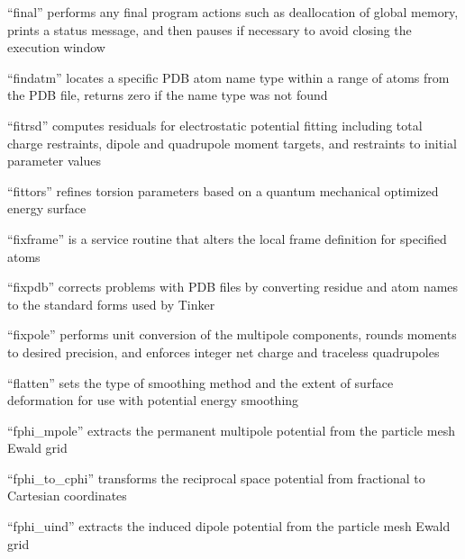\documentclass[letterpaper,11pt,english]{sphinxmanual}
\begin{document}
“final” performs any final program actions such as deallocation
of global memory, prints a status message, and then pauses if
necessary to avoid closing the execution window


“findatm” locates a specific PDB atom name type within a
range of atoms from the PDB file, returns zero if the name
type was not found


“fitrsd” computes residuals for electrostatic potential fitting
including total charge restraints, dipole and quadrupole moment
targets, and restraints to initial parameter values


“fittors” refines torsion parameters based on a quantum
mechanical optimized energy surface


“fixframe” is a service routine that alters the local frame
definition for specified atoms


“fixpdb” corrects problems with PDB files by converting residue
and atom names to the standard forms used by Tinker


“fixpole” performs unit conversion of the multipole components,
rounds moments to desired precision, and enforces integer net
charge and traceless quadrupoles


“flatten” sets the type of smoothing method and the extent of
surface deformation for use with potential energy smoothing


“fphi\_mpole” extracts the permanent multipole potential from
the particle mesh Ewald grid


“fphi\_to\_cphi” transforms the reciprocal space potential from
fractional to Cartesian coordinates


“fphi\_uind” extracts the induced dipole potential from
the particle mesh Ewald grid
\end{document}
